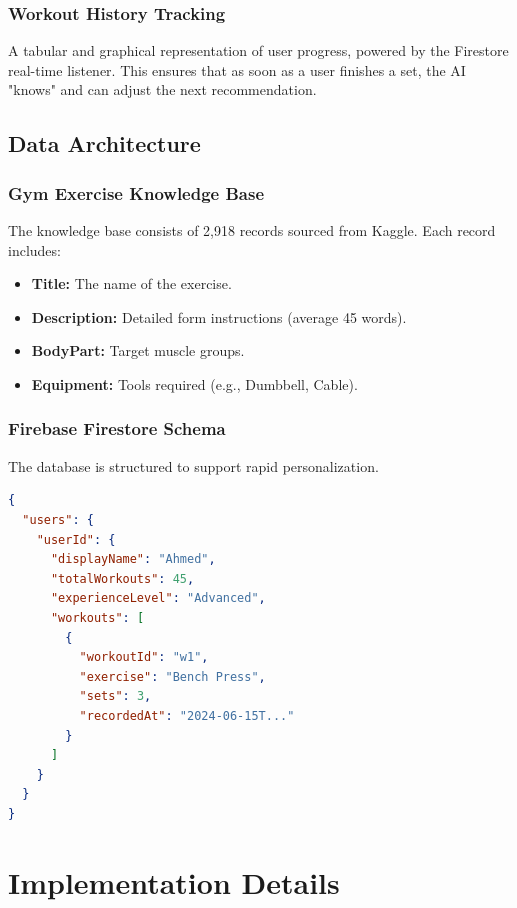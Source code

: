 \documentclass[12pt,a4paper]{report}
\begin{document}
\subsection{Workout History Tracking}
A tabular and graphical representation of user progress, powered by the Firestore real-time listener. This ensures that as soon as a user finishes a set, the AI "knows" and can adjust the next recommendation.

\section{Data Architecture}
\subsection{Gym Exercise Knowledge Base}
The knowledge base consists of 2,918 records sourced from Kaggle. Each record includes:
\begin{itemize}
    \item \textbf{Title:} The name of the exercise.
    \item \textbf{Description:} Detailed form instructions (average 45 words).
    \item \textbf{BodyPart:} Target muscle groups.
    \item \textbf{Equipment:} Tools required (e.g., Dumbbell, Cable).
\end{itemize}

\subsection{Firebase Firestore Schema}
The database is structured to support rapid personalization.
\begin{lstlisting}[language=json, caption={Firestore Database Schema}]
{
  "users": {
    "userId": {
      "displayName": "Ahmed",
      "totalWorkouts": 45,
      "experienceLevel": "Advanced",
      "workouts": [
        {
          "workoutId": "w1",
          "exercise": "Bench Press",
          "sets": 3,
          "recordedAt": "2024-06-15T..."
        }
      ]
    }
  }
}
\end{lstlisting}

\chapter{Implementation Details}
\end{document}
